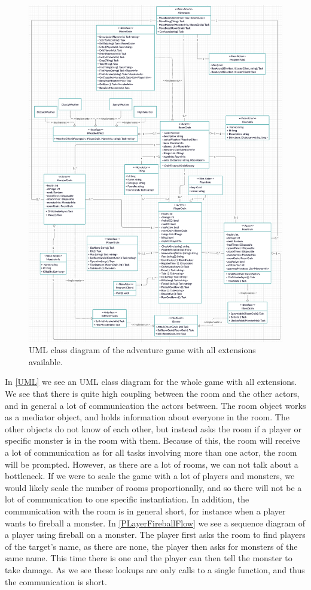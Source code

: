 \begin{figure}[H]
	\centering
	\includegraphics[width=\linewidth]{Materials/Adventuregame/ClassDiagram}
	\caption{UML class diagram of the adventure game with all extensions available.}
	\label{UML}
\end{figure}
In \autoref{UML} we see an UML class diagram for the whole game with all extensions. We see that there is quite high coupling between the room and the other actors, and in general a lot of communication the actors between. The room object works as a mediator object, and holds information about everyone in the room. The other objects do not know of each other, but instead asks the room if a player or specific monster is in the room with them. Because of this, the room will receive a lot of communication as for all tasks involving more than one actor, the room will be prompted. However, as there are a lot of rooms, we can not talk about a bottleneck. If we were to scale the game with a lot of players and monsters, we would likely scale the number of rooms proportionally, and so there will not be a lot of communication to one specific instantiation. In addition, the communication with the room is in general short, for instance when a player wants to fireball a monster. In \autoref{PLayerFireballFlow} we see a sequence diagram of a player using fireball on a monster. The player first asks the room to find players of the target's name, as there are none, the player then asks for monsters of the same name. This time there is one and the player can then tell the monster to take damage. As we see these lookups are only calls to a single function, and thus the communication is short.\\
